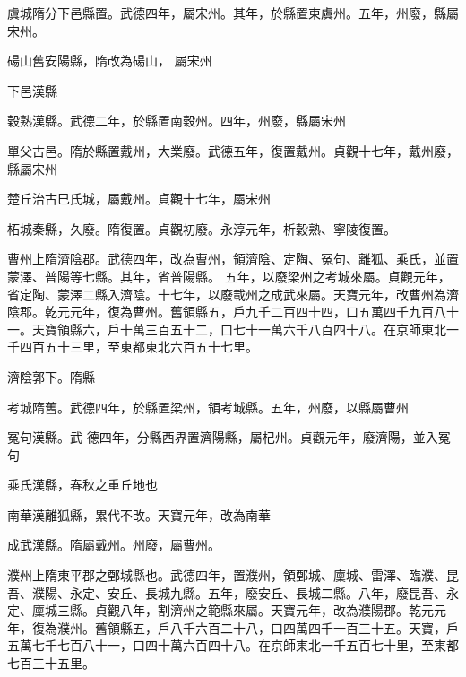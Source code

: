 \begin{pinyinscope}
 虞城隋分下邑縣置。武德四年，屬宋州。其年，於縣置東虞州。五年，州廢，縣屬宋州。



 碭山舊安陽縣，隋改為碭山，
 屬宋州



 下邑漢縣



 穀熟漢縣。武德二年，於縣置南穀州。四年，州廢，縣屬宋州



 單父古邑。隋於縣置戴州，大業廢。武德五年，復置戴州。貞觀十七年，戴州廢，縣屬宋州



 楚丘治古巳氏城，屬戴州。貞觀十七年，屬宋州



 柘城秦縣，久廢。隋復置。貞觀初廢。永淳元年，析穀熟、寧陵復置。



 曹州上隋濟陰郡。武德四年，改為曹州，領濟陰、定陶、冤句、離狐、乘氏，並置蒙澤、普陽等七縣。其年，省普陽縣。
 五年，以廢梁州之考城來屬。貞觀元年，省定陶、蒙澤二縣入濟陰。十七年，以廢載州之成武來屬。天寶元年，改曹州為濟陰郡。乾元元年，復為曹州。舊領縣五，戶九千二百四十四，口五萬四千九百八十一。天寶領縣六，戶十萬三百五十二，口七十一萬六千八百四十八。在京師東北一千四百五十三里，至東都東北六百五十七里。



 濟陰郭下。隋縣



 考城隋舊。武德四年，於縣置梁州，領考城縣。五年，州廢，以縣屬曹州



 冤句漢縣。武
 德四年，分縣西界置濟陽縣，屬杞州。貞觀元年，廢濟陽，並入冤句



 乘氏漢縣，春秋之重丘地也



 南華漢離狐縣，累代不改。天寶元年，改為南華



 成武漢縣。隋屬戴州。州廢，屬曹州。



 濮州上隋東平郡之鄄城縣也。武德四年，置濮州，領鄄城、廩城、雷澤、臨濮、昆吾、濮陽、永定、安丘、長城九縣。五年，廢安丘、長城二縣。八年，廢昆吾、永定、廩城三縣。貞觀八年，割濟州之範縣來屬。天寶元年，改為濮陽郡。乾元元
 年，復為濮州。舊領縣五，戶八千六百二十八，口四萬四千一百三十五。天寶，戶五萬七千七百八十一，口四十萬六百四十八。在京師東北一千五百七十里，至東都七百三十五里。




\end{pinyinscope}
